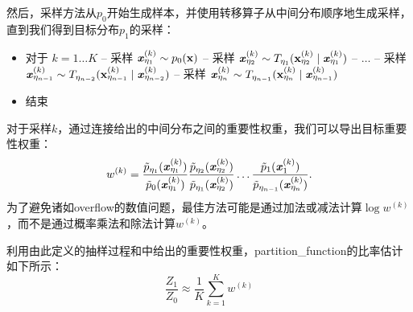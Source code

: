 然后，采样方法从$p_0$开始生成样本，并使用转移算子从中间分布顺序地生成采样，直到我们得到目标分布$p_1$的采样：
\begin{itemize}
	\item 对于 $k=1 \dots K$ 
		\newline
		\quad\quad -- 采样 $ \boldsymbol{\mathit{x}}_{\eta_1}^{(k)} \sim p_0(\mathbf{x}) $
		\newline
		\quad\quad -- 采样 $ \boldsymbol{\mathit{x}}_{\eta_2}^{(k)} \sim T_{\eta_1}(\mathbf{x}_{\eta_2}^{(k)} \mid \boldsymbol{\mathit{x}}_{\eta_1}^{(k)} ) $
		\newline
		\quad\quad -- $\dots$
		\newline
		\quad\quad -- 采样 $ \boldsymbol{\mathit{x}}_{\eta_{n-1}}^{(k)} \sim T_{\eta_{n-2}}(\mathbf{x}_{\eta_{n-1}}^{(k)} \mid \boldsymbol{\mathit{x}}_{\eta_{n-2}}^{(k)} ) $
		\newline
		\quad\quad -- 采样 $ \boldsymbol{\mathit{x}}_{\eta_n}^{(k)} \sim T_{\eta_{n-1}}(\mathbf{x}_{\eta_n}^{(k)} \mid \boldsymbol{\mathit{x}}_{\eta_{n-1}}^{(k)} ) $
	\item 结束
\end{itemize}


对于采样$k$，通过连接给出的中间分布之间的重要性权重，我们可以导出目标重要性权重：
\begin{equation}
\label{eq:18.52}
	w^{(k)} = \frac{ \tilde{p}_{\eta_1} ( \boldsymbol{\mathit{x}}_{\eta_1}^{(k)} )  }{  \tilde{p}_{0} ( \boldsymbol{\mathit{x}}_{\eta_1}^{(k)} )  }
\frac{ \tilde{p}_{\eta_2} ( \boldsymbol{\mathit{x}}_{\eta_2}^{(k)} )  }{  \tilde{p}_{\eta_1} ( \boldsymbol{\mathit{x}}_{\eta_2}^{(k)} )  }
\dots
\frac{ \tilde{p}_{1} ( \boldsymbol{\mathit{x}}_{1}^{(k)} )  }{  \tilde{p}_{\eta_{n-1}} ( \boldsymbol{\mathit{x}}_{\eta_n}^{(k)} )  } .
\end{equation}
为了避免诸如\gls{overflow}的数值问题，最佳方法可能是通过加法或减法计算$\log w^{(k)}$，而不是通过概率乘法和除法计算$w^{(k)}$。


利用由此定义的抽样过程和中给出的重要性权重，\gls{partition_function}的比率估计如下所示：
\begin{equation}
	\frac{Z_1}{Z_0} \approx \frac{1}{K} \sum_{k=1}^K w^{(k)}
\end{equation}


